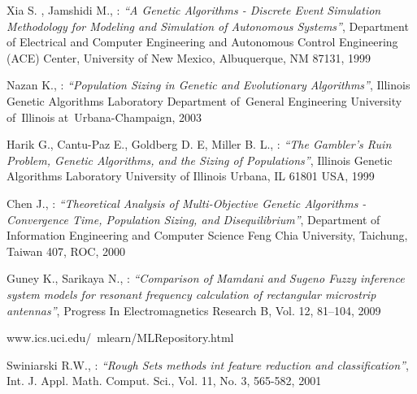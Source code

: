 \begin{thebibliography}{99}
	Xia S. , Jamshidi M., : \textit{``A Genetic Algorithms - Discrete Event Simulation
	Methodology for Modeling and Simulation of Autonomous Systems''},
	Department of Electrical and Computer Engineering and Autonomous Control Engineering
	(ACE) Center, University of New Mexico, Albuquerque, NM 87131, 1999

	Nazan K., : \textit{``Population Sizing in Genetic and Evolutionary Algorithms''},
	Illinois Genetic Algorithms Laboratory Department of~General Engineering University 
	of~Illinois at~Urbana-Champaign, 2003

	Harik G., Cantu-Paz E., Goldberg D. E, Miller B. L., : \textit{``The Gambler’s Ruin Problem, Genetic Algorithms, and the Sizing of Populations''}, 
	Illinois Genetic Algorithms Laboratory University of Illinois Urbana, IL
	61801 USA, 1999

	Chen J., : \textit{``Theoretical Analysis of Multi-Objective Genetic
	Algorithms - Convergence Time, Population Sizing, and Disequilibrium''}, 
	Department of Information Engineering and Computer Science Feng Chia University,
	Taichung, Taiwan 407, ROC, 2000

	Guney K., Sarikaya N., : \textit{``Comparison of Mamdani and Sugeno Fuzzy
    inference system models for resonant frequency calculation of rectangular
    microstrip antennas''}, Progress In Electromagnetics Research B, Vol. 12,
    81–104, 2009

    www.ics.uci.edu/~mlearn/MLRepository.html

	Swiniarski R.W., : \textit{``Rough Sets methods int feature reduction and
    classification''}, Int. J. Appl. Math. Comput. Sci., Vol. 11, No. 3,
    565-582, 2001

\end{thebibliography}
\newpage
\listoffigures
\listoftables

